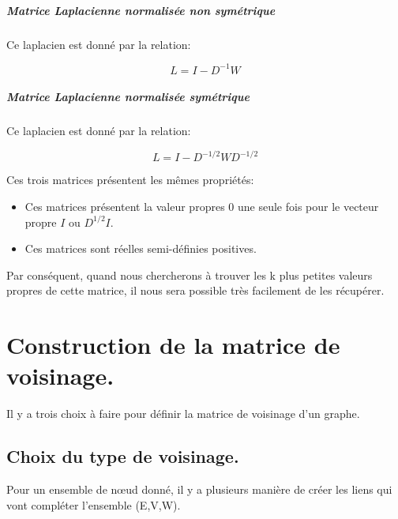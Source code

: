 \paragraph{Matrice Laplacienne normalisée non symétrique}

\medskip 

Ce laplacien est donné par la relation:

\begin{equation}
L = I-D^{-1}W
\end{equation}


\paragraph{Matrice Laplacienne normalisée symétrique}

\medskip 

Ce laplacien est donné par la relation:

\begin{equation}
L = I-D^{-1/2}WD^{-1/2}
\end{equation}

Ces trois matrices présentent les mêmes propriétés:

\begin{itemize}
\item Ces matrices présentent la valeur propres 0 une seule fois pour le vecteur propre $I$ ou $D^{1/2}I$.
\item Ces matrices sont réelles semi-définies positives.
\end{itemize}

Par conséquent, quand nous chercherons à trouver les k plus petites valeurs propres de cette matrice, il nous sera possible très facilement de les récupérer.

\chapter{Construction de la matrice de voisinage.}


Il y a trois choix à faire pour définir la matrice de voisinage d'un graphe.

\section{Choix du type de voisinage.}

Pour un ensemble de nœud donné, il y a plusieurs manière de créer les liens qui vont compléter l'ensemble (E,V,W).

\medskip

